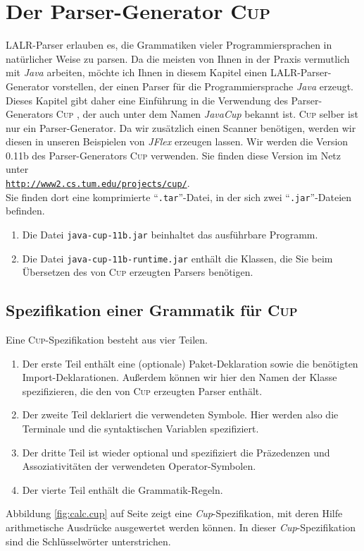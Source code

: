 \chapter{Der Parser-Generator \textsc{Cup} \label{chapter:cup} \label{chapter:ply}}
LALR-Parser erlauben es, die Grammatiken vieler Programmiersprachen in nat\"urlicher Weise
zu parsen.  Da die meisten von Ihnen in der Praxis vermutlich mit \textsl{Java} arbeiten, 
m\"ochte ich Ihnen in diesem Kapitel einen LALR-Parser-Generator vorstellen, der einen Parser f\"ur die
Programmiersprache \textsl{Java} erzeugt.  Dieses Kapitel gibt daher eine
Einf\"uhrung in die Verwendung des Parser-Generators \textsc{Cup} \cite{hudson:1999}, der auch
unter dem Namen \textsl{JavaCup} bekannt ist.
\textsc{Cup} selber ist nur ein Parser-Generator.  Da wir
zus\"atzlich einen Scanner ben\"otigen, werden wir diesen in unseren Beispielen von \textsl{JFlex}
erzeugen lassen.  Wir werden die Version 0.11b des Parser-Generators \textsc{Cup} 
verwenden.  Sie finden diese Version im Netz unter 
\\[0.2cm]
\hspace*{1.3cm}
\href{http://www2.cs.tum.edu/projects/cup/}{\texttt{http://www2.cs.tum.edu/projects/cup/}}.
\\[0.2cm]
Sie finden dort eine komprimierte ``\texttt{.tar}''-Datei, in der sich zwei
``\texttt{.jar}''-Dateien befinden.
\begin{enumerate}
\item Die Datei \texttt{java-cup-11b.jar} beinhaltet das ausf\"uhrbare Programm.
\item Die Datei \texttt{java-cup-11b-runtime.jar} enth\"alt die Klassen, die Sie beim \"Ubersetzen des
      von \textsc{Cup} erzeugten Parsers ben\"otigen.
\end{enumerate}

\section{Spezifikation einer Grammatik f\"ur  \textsc{Cup}}
Eine \textsc{Cup}-Spezifikation besteht aus vier Teilen.
\begin{enumerate}
\item Der erste Teil enth\"alt eine (optionale) Paket-Deklaration sowie die ben\"otigten
      Import-Deklarationen.  Au{\ss}erdem k\"onnen wir hier den Namen der Klasse spezifizieren, die den
      von \textsc{Cup} erzeugten Parser enth\"alt.
\item Der zweite Teil deklariert die verwendeten Symbole.  Hier werden also die Terminale
      und die syntaktischen Variablen spezifiziert.
\item Der dritte Teil ist wieder optional und spezifiziert die Pr\"azedenzen und Assoziativit\"aten 
      der verwendeten Operator-Symbolen.
\item Der vierte Teil enth\"alt die Grammatik-Regeln.
\end{enumerate}
Abbildung \ref{fig:calc.cup} auf Seite \pageref{fig:calc.cup} zeigt eine \textsl{Cup}-Spezifikation,
mit deren Hilfe arithmetische Ausdr\"ucke ausgewertet werden k\"onnen.  In dieser
\textsl{Cup}-Spezifikation sind die Schl\"usselw\"orter unterstrichen.

